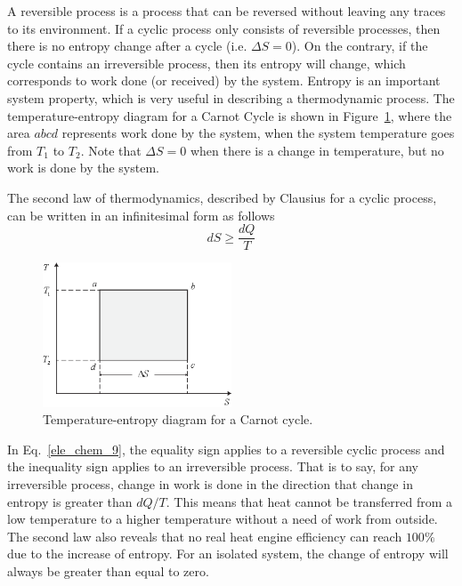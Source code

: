 \documentclass[11pt,a4paper]{article}
\numberwithin{equation}{section}
\theoremstyle{it}
\theoremstyle{definition}
\begin{document}
A reversible process is a process that can be reversed without leaving any traces to its environment. If a cyclic process only consists of reversible processes, then there is no entropy change after a cycle (i.e. $\Delta S=0$). On the contrary, if the cycle contains an irreversible process, then its entropy will change, which corresponds to work done (or received) by the system. Entropy is an important system property, which is very useful in describing a thermodynamic process. The temperature-entropy diagram for a Carnot Cycle is shown in Figure~\ref{temperature_entropy}, where the area $abcd$ represents work done by the system, when the system temperature goes from $T_1$ to $T_2$. Note that $\Delta S=0$ when there is a change in temperature, but no work is done by the system.

The second law of thermodynamics, described by Clausius for a cyclic process, can be written in an infinitesimal form as follows
\begin{equation}\label{ele_chem_9}
	dS\ge\frac{dQ}{T}
\end{equation}
\begin{figure}[H]
	\centering
	\includegraphics[width = 0.5\textwidth, width = 200pt, angle = 0, keepaspectratio]{figures/pem_fuel_cell/temperature_entropy.eps}
	\captionsetup{width=0.5\textwidth}		
	\caption{Temperature-entropy diagram for a Carnot cycle.}
	\label{temperature_entropy}
\end{figure}
In Eq.~\eqref{ele_chem_9}, the equality sign applies to a reversible cyclic process and the inequality sign applies to an irreversible process. That is to say, for any irreversible process, change in work is done in the direction that change in entropy is greater than $dQ/T$. This means that heat cannot be transferred from a low temperature to a higher temperature without a need of work from outside. The second law also reveals that no real heat engine efficiency can reach $100\%$ due to the increase of entropy. For an isolated system, the change of entropy will always be greater than equal to zero.
\end{document}
